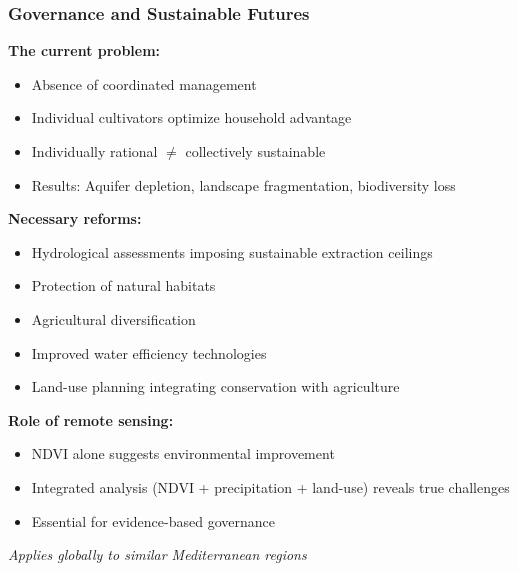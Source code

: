 \documentclass{beamer}
\begin{document}
\begin{frame}
\frametitle{Governance and Sustainable Futures}

\textbf{The current problem:}
\begin{itemize}
  \item Absence of coordinated management
  \item Individual cultivators optimize household advantage
  \item Individually rational $\neq$ collectively sustainable
  \item Results: Aquifer depletion, landscape fragmentation, biodiversity loss
\end{itemize}

\textbf{Necessary reforms:}
\begin{itemize}
  \item Hydrological assessments imposing sustainable extraction ceilings
  \item Protection of natural habitats
  \item Agricultural diversification
  \item Improved water efficiency technologies
  \item Land-use planning integrating conservation with agriculture
\end{itemize}

\textbf{Role of remote sensing:}
\begin{itemize}
  \item NDVI alone suggests environmental improvement
  \item Integrated analysis (NDVI + precipitation + land-use) reveals true challenges
  \item Essential for evidence-based governance
\end{itemize}

\begin{center}
  \small{\textit{Applies globally to similar Mediterranean regions}}
\end{center}
\end{frame}
\end{document}
